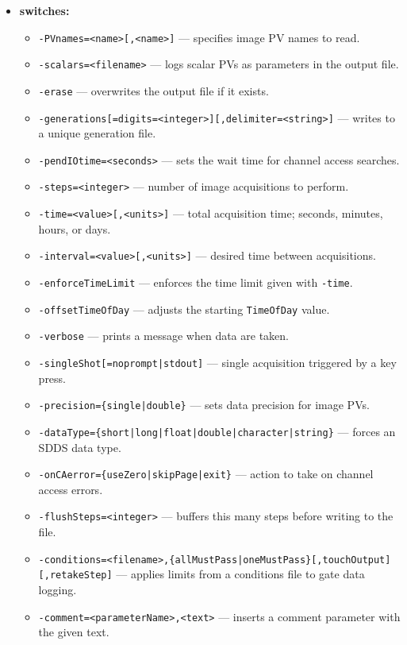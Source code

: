 \begin{itemize}
\begin{verbatim}
    [-singleColumn] [-logOnChange] [-device=<name>] [-retakeStep]
\end{verbatim}
\item {\bf switches:}
  \begin{itemize}
  \item {\verb+-PVnames=<name>[,<name>]+} --- specifies image PV names to read.
  \item {\verb+-scalars=<filename>+} --- logs scalar PVs as parameters in the output file.
  \item {\tt -erase} --- overwrites the output file if it exists.
  \item {\verb+-generations[=digits=<integer>][,delimiter=<string>]+} --- writes to a unique generation file.
  \item {\verb+-pendIOtime=<seconds>+} --- sets the wait time for channel access searches.
  \item {\verb+-steps=<integer>+} --- number of image acquisitions to perform.
  \item {\verb+-time=<value>[,<units>]+} --- total acquisition time; seconds, minutes, hours, or days.
  \item {\verb+-interval=<value>[,<units>]+} --- desired time between acquisitions.
  \item {\tt -enforceTimeLimit} --- enforces the time limit given with \verb+-time+.
  \item {\tt -offsetTimeOfDay} --- adjusts the starting \verb+TimeOfDay+ value.
  \item {\tt -verbose} --- prints a message when data are taken.
  \item {\verb+-singleShot[=noprompt|stdout]+} --- single acquisition triggered by a key press.
  \item {\verb+-precision={single|double}+} --- sets data precision for image PVs.
  \item {\verb+-dataType={short|long|float|double|character|string}+} --- forces an SDDS data type.
  \item {\verb+-onCAerror={useZero|skipPage|exit}+} --- action to take on channel access errors.
  \item {\verb+-flushSteps=<integer>+} --- buffers this many steps before writing to the file.
  \item {\verb+-conditions=<filename>,{allMustPass|oneMustPass}[,touchOutput][,retakeStep]+} ---
        applies limits from a conditions file to gate data logging.
  \item {\verb+-comment=<parameterName>,<text>+} --- inserts a comment parameter with the given text.

\end{itemize}
\end{itemize}
